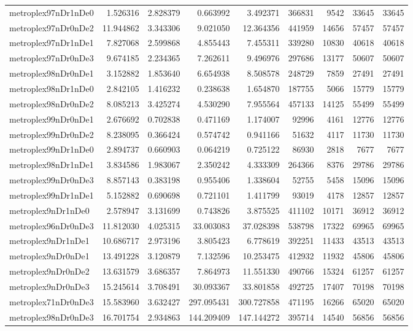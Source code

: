 \documentclass[../../../thesis.tex]{subfiles}
\begin{document}
\begin{longtable}{|l|r|r|r|r|r|r|r|r|}
metroplex97nDr1nDe0 & 1.526316 & 2.828379 & 0.663992 & 3.492371 & 366831 & 9542 & 33645 & 33645 \\
metroplex97nDr0nDe2 & 11.944862 & 3.343306 & 9.021050 & 12.364356 & 441959 & 14656 & 57457 & 57457 \\
metroplex97nDr1nDe1 & 7.827068 & 2.599868 & 4.855443 & 7.455311 & 339280 & 10830 & 40618 & 40618 \\
metroplex97nDr0nDe3 & 9.674185 & 2.234365 & 7.262611 & 9.496976 & 297686 & 13177 & 50607 & 50607 \\
metroplex98nDr0nDe1 & 3.152882 & 1.853640 & 6.654938 & 8.508578 & 248729 & 7859 & 27491 & 27491 \\
metroplex98nDr1nDe0 & 2.842105 & 1.416232 & 0.238638 & 1.654870 & 187755 & 5066 & 15779 & 15779 \\
metroplex98nDr0nDe2 & 8.085213 & 3.425274 & 4.530290 & 7.955564 & 457133 & 14125 & 55499 & 55499 \\
metroplex99nDr0nDe1 & 2.676692 & 0.702838 & 0.471169 & 1.174007 & 92996 & 4161 & 12776 & 12776 \\
metroplex99nDr0nDe2 & 8.238095 & 0.366424 & 0.574742 & 0.941166 & 51632 & 4117 & 11730 & 11730 \\
metroplex99nDr1nDe0 & 2.894737 & 0.660903 & 0.064219 & 0.725122 & 86930 & 2818 & 7677 & 7677 \\
metroplex98nDr1nDe1 & 3.834586 & 1.983067 & 2.350242 & 4.333309 & 264366 & 8376 & 29786 & 29786 \\
metroplex99nDr0nDe3 & 8.857143 & 0.383198 & 0.955406 & 1.338604 & 52755 & 5458 & 15096 & 15096 \\
metroplex99nDr1nDe1 & 5.152882 & 0.690698 & 0.721101 & 1.411799 & 93019 & 4178 & 12857 & 12857 \\
metroplex9nDr1nDe0 & 2.578947 & 3.131699 & 0.743826 & 3.875525 & 411102 & 10171 & 36912 & 36912 \\
metroplex96nDr0nDe3 & 11.812030 & 4.025315 & 33.003083 & 37.028398 & 538798 & 17322 & 69965 & 69965 \\
metroplex9nDr1nDe1 & 10.686717 & 2.973196 & 3.805423 & 6.778619 & 392251 & 11433 & 43513 & 43513 \\
metroplex9nDr0nDe1 & 13.491228 & 3.120879 & 7.132596 & 10.253475 & 412932 & 11932 & 45806 & 45806 \\
metroplex9nDr0nDe2 & 13.631579 & 3.686357 & 7.864973 & 11.551330 & 490766 & 15324 & 61257 & 61257 \\
metroplex9nDr0nDe3 & 15.245614 & 3.708491 & 30.093367 & 33.801858 & 492725 & 17407 & 70198 & 70198 \\
metroplex71nDr0nDe3 & 15.583960 & 3.632427 & 297.095431 & 300.727858 & 471195 & 16266 & 65020 & 65020 \\
metroplex98nDr0nDe3 & 16.701754 & 2.934863 & 144.209409 & 147.144272 & 395714 & 14540 & 56856 & 56856 \\
\end{longtable}
\end{document}
